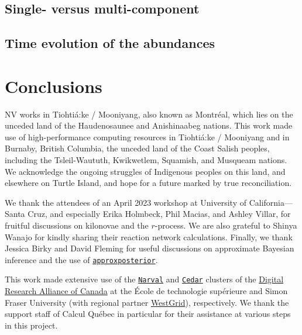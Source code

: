 \documentclass[twocolumn, twocolappendix]{aastex63}
\def\approxposterior{\texttt{approxposterior}}
\begin{document}
\subsection{Single- versus multi-component}


\subsection{Time evolution of the abundances}







\section{Conclusions}\label{sec:conco}



\acknowledgments


NV works in Tiohti{\'a}:ke / Mooniyang, also known as Montr{\'e}al, which lies on the unceded land of the Haudenosaunee and Anishinaabeg nations. This work made use of high-performance computing resources in Tiohti{\'a}:ke / Mooniyang and in Burnaby, British Columbia, the unceded land of the Coast Salish peoples, including the Tsleil-Waututh, Kwikwetlem, Squamish, and Musqueam nations. We acknowledge the ongoing struggles of Indigenous peoples on this land, and elsewhere on Turtle Island, and hope for a future marked by true reconciliation. 

We thank the attendees of an April 2023 workshop at University of California---Santa Cruz, and especially Erika Holmbeck, Phil Macias, and Ashley Villar, for fruitful discussions on kilonovae and the $r$-process. We are also grateful to Shinya Wanajo for kindly sharing their reaction network calculations. Finally, we thank Jessica Birky and David Fleming for useful discussions on approximate Bayesian inference and the use of \href{https://dflemin3.github.io/approxposterior/index.html}{\approxposterior}.

This work made extensive use of the \href{https://docs.alliancecan.ca/wiki/Narval/en}{\texttt{Narval}} and \href{https://docs.alliancecan.ca/wiki/Cedar}{\texttt{Cedar}} clusters of the \href{https://alliancecan.ca/en}{Digital Research Alliance of Canada} at the {\'E}cole de technologie sup{\'e}rieure and Simon Fraser University (with regional partner \href{https://www.westgrid.ca/}{WestGrid}), respectively. We thank the support staff of Calcul Qu{\'e}bec in particular for their assistance at various steps in this project. 
\end{document}
